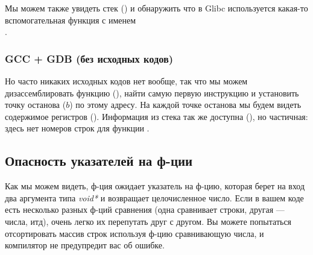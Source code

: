 Мы можем также увидеть стек () и обнаружить что в Glibc используется какая-то вспомогательная функция с именем\\
.



\subsubsection{GCC + GDB (без исходных кодов)}

Но часто никаких исходных кодов нет вообще, так что мы можем дизассемблировать функцию \comp (), 
найти самую первую инструкцию \CMP и установить точку останова ($b$) по этому адресу.
На каждой точке останова мы будем видеть содержимое регистров ().
Информация из стека так же доступна (), 
но частичная: здесь нет номеров строк для функции \comp.



\subsection{Опасность указателей на ф-ции}

Как мы можем видеть, ф-ция \qsort ожидает указатель на ф-цию, которая берет на вход два аргумента типа \emph{void*}
и возвращает целочисленное число.
Если в вашем коде есть несколько разных ф-ций сравнения (одна сравнивает строки, другая --- числа, итд), очень
легко их перепутать друг с другом.
Вы можете попытаться отсортировать массив строк используя ф-цию сравнивающую числа, и компилятор не предупредит вас
об ошибке.

